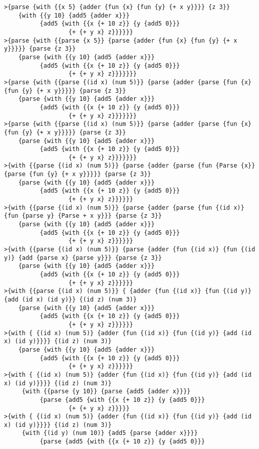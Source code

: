 \documentclass[letterpaper,11pt]{article}
\begin{document}
\begin{lstlisting}[breaklines]
>{parse {with {{x 5} {adder {fun {x} {fun {y} {+ x y}}}} {z 3}}
    {with {{y 10} {add5 {adder x}}}
          {add5 {with {{x {+ 10 z}} {y {add5 0}}}
                  {+ {+ y x} z}}}}}}
>{parse {with {{parse {x 5}} {parse {adder {fun {x} {fun {y} {+ x y}}}}} {parse {z 3}}
    {parse {with {{y 10} {add5 {adder x}}}
          {add5 {with {{x {+ 10 z}} {y {add5 0}}}
                  {+ {+ y x} z}}}}}}}
>{parse {with {{parse {(id x) (num 5)}} {parse {adder {parse {fun {x} {fun {y} {+ x y}}}}} {parse {z 3}}
    {parse {with {{y 10} {add5 {adder x}}}
          {add5 {with {{x {+ 10 z}} {y {add5 0}}}
                  {+ {+ y x} z}}}}}}}
>{parse {with {{parse {(id x) (num 5)}} {parse {adder {parse {fun {x} {fun {y} {+ x y}}}}} {parse {z 3}}
    {parse {with {{y 10} {add5 {adder x}}}
          {add5 {with {{x {+ 10 z}} {y {add5 0}}}
                  {+ {+ y x} z}}}}}}}
>{with {{parse {(id x) (num 5)}} {parse {adder {parse {fun {Parse {x}} {parse {fun {y} {+ x y}}}}} {parse {z 3}}
    {parse {with {{y 10} {add5 {adder x}}}
          {add5 {with {{x {+ 10 z}} {y {add5 0}}}
                  {+ {+ y x} z}}}}}}
>{with {{parse {(id x) (num 5)}} {parse {adder {parse {fun {(id x)} {fun {parse y} {Parse + x y}}} {parse {z 3}}
    {parse {with {{y 10} {add5 {adder x}}}
          {add5 {with {{x {+ 10 z}} {y {add5 0}}}
                  {+ {+ y x} z}}}}}}
>{with {{parse {(id x) (num 5)}} {parse {adder {fun {(id x)} {fun {(id y)} {add {parse x} {parse y}}} {parse {z 3}}
    {parse {with {{y 10} {add5 {adder x}}}
          {add5 {with {{x {+ 10 z}} {y {add5 0}}}
                  {+ {+ y x} z}}}}}}
>{with {{parse {(id x) (num 5)}} { {adder {fun {(id x)} {fun {(id y)} {add (id x) (id y)}} {(id z) (num 3)}
    {parse {with {{y 10} {add5 {adder x}}}
          {add5 {with {{x {+ 10 z}} {y {add5 0}}}
                  {+ {+ y x} z}}}}}}
>{with { {(id x) (num 5)} {adder {fun {(id x)} {fun {(id y)} {add (id x) (id y)}}}} {(id z) (num 3)}
    {parse {with {{y 10} {add5 {adder x}}}
          {add5 {with {{x {+ 10 z}} {y {add5 0}}}
                  {+ {+ y x} z}}}}}}
>{with { {(id x) (num 5)} {adder {fun {(id x)} {fun {(id y)} {add (id x) (id y)}}}} {(id z) (num 3)}
     {with {{parse {y 10}} {parse {add5 {adder x}}}}
          {parse {add5 {with {{x {+ 10 z}} {y {add5 0}}}
                  {+ {+ y x} z}}}}}
>{with { {(id x) (num 5)} {adder {fun {(id x)} {fun {(id y)} {add (id x) (id y)}}}} {(id z) (num 3)}
     {with {(id y) (num 10)} {add5 {parse {adder x}}}}
          {parse {add5 {with {{x {+ 10 z}} {y {add5 0}}}

\end{lstlisting}
\end{document}
